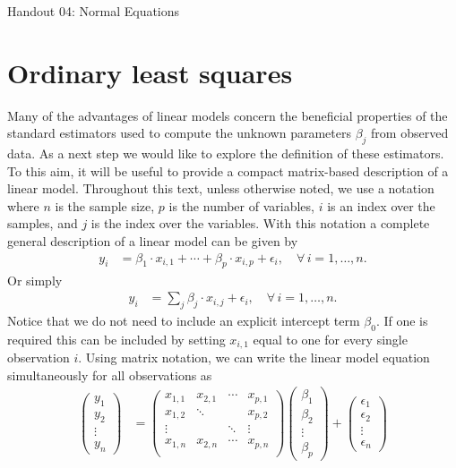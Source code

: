 \documentclass[12pt,hidelinks]{article}
\numberwithin{equation}{section}
\begin{document}
{\LARGE Handout 04: Normal Equations}

\vspace*{18pt}


\section{Ordinary least squares}

Many of the advantages of linear models concern the beneficial properties
of the standard estimators used to compute the unknown parameters
$\beta_j$ from observed data. As a next step we would like to explore
the definition of these estimators. To this aim, it will be useful to
provide a compact matrix-based description of a linear model. Throughout
this text, unless otherwise noted, we use a notation where $n$ is the
sample size, $p$ is the number of variables, $i$ is an index over the
samples, and $j$ is the index over the variables. With this notation a
complete general description of a linear model can be given by
\begin{align}
y_i &= \beta_1 \cdot x_{i,1} + \cdots + \beta_p \cdot x_{i,p} + \epsilon_i, \quad \forall\,  i = 1, \ldots, n.
\end{align}
Or simply
\begin{align}
y_i &= \sum_j \beta_j \cdot x_{i,j} + \epsilon_i, \quad \forall\,  i = 1, \ldots, n.
\end{align}
Notice that we do not need to include an explicit intercept term
$\beta_0$. If one is required this can be included by setting
$x_{i,1}$ equal to one for every single observation $i$. Using
matrix notation, we can write the linear model equation
simultaneously for all observations as
\begin{align}
\left(\begin{array}{c}y_1\\ y_2\\ \vdots\\ y_n\end{array}\right) &=
  \left(\begin{array}{cccc}x_{1,1}&x_{2,1}&\cdots&x_{p,1}\\
                           x_{1,2}&\ddots&&x_{p,2}\\
                           \vdots&&\ddots&\vdots\\
                           x_{1,n}&x_{2,n}&\cdots&x_{p,n}\\\end{array}\right)
  \left(\begin{array}{c}\beta_1\\ \beta_2\\ \vdots\\ \beta_p\end{array}\right) +
  \left(\begin{array}{c}\epsilon_1\\ \epsilon_2\\ \vdots\\ \epsilon_n\end{array}\right)
\end{align}
\end{document}
